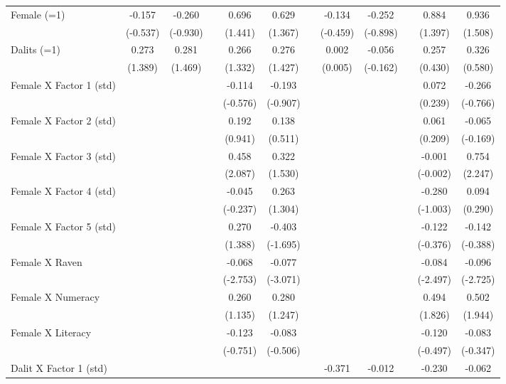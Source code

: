 {\begin{longtable}{@{\extracolsep{\fill}}lccccccccccc}
    Female (=1) & -0.157 & -0.260 &   & 0.696 & 0.629 &   & -0.134 & -0.252 &   & 0.884 & 0.936 \\
      & (-0.537) & (-0.930) &   & (1.441) & (1.367) &   & (-0.459) & (-0.898) &   & (1.397) & (1.508) \\
    Dalits (=1) & 0.273 & 0.281 &   & 0.266 & 0.276 &   & 0.002 & -0.056 &   & 0.257 & 0.326 \\
      & (1.389) & (1.469) &   & (1.332) & (1.427) &   & (0.005) & (-0.162) &   & (0.430) & (0.580) \\
    Female X Factor 1 (std) &   &   &   & -0.114 & -0.193 &   &   &   &   & 0.072 & -0.266 \\
      &   &   &   & (-0.576) & (-0.907) &   &   &   &   & (0.239) & (-0.766) \\
    Female X Factor 2 (std) &   &   &   & 0.192 & 0.138 &   &   &   &   & 0.061 & -0.065 \\
      &   &   &   & (0.941) & (0.511) &   &   &   &   & (0.209) & (-0.169) \\
    Female X Factor 3 (std) &   &   &   & 0.458 & 0.322 &   &   &   &   & -0.001 & 0.754 \\
      &   &   &   & (2.087) & (1.530) &   &   &   &   & (-0.002) & (2.247) \\
    Female X Factor 4 (std) &   &   &   & -0.045 & 0.263 &   &   &   &   & -0.280 & 0.094 \\
      &   &   &   & (-0.237) & (1.304) &   &   &   &   & (-1.003) & (0.290) \\
    Female X Factor 5 (std) &   &   &   & 0.270 & -0.403 &   &   &   &   & -0.122 & -0.142 \\
      &   &   &   & (1.388) & (-1.695) &   &   &   &   & (-0.376) & (-0.388) \\
    Female X Raven &   &   &   & -0.068 & -0.077 &   &   &   &   & -0.084 & -0.096 \\
      &   &   &   & (-2.753) & (-3.071) &   &   &   &   & (-2.497) & (-2.725) \\
    Female X Numeracy &   &   &   & 0.260 & 0.280 &   &   &   &   & 0.494 & 0.502 \\
      &   &   &   & (1.135) & (1.247) &   &   &   &   & (1.826) & (1.944) \\
    Female X Literacy &   &   &   & -0.123 & -0.083 &   &   &   &   & -0.120 & -0.083 \\
      &   &   &   & (-0.751) & (-0.506) &   &   &   &   & (-0.497) & (-0.347) \\
    Dalit X Factor 1 (std) &   &   &   &   &   &   & -0.371 & -0.012 &   & -0.230 & -0.062 \\

\end{longtable}}
